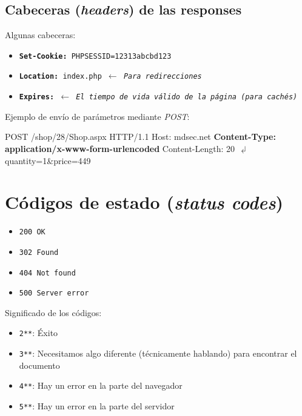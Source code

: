 \documentclass[a4paper,11pt]{memoir}
\begin{document}
\subsection{Cabeceras (\emph{headers}) de las responses}

Algunas cabeceras:

\begin{itemize}
    \item \texttt{\textbf{Set-Cookie:} PHPSESSID=12313abcbd123}
    \item \texttt{\textbf{Location:} index.php \(\leftarrow\) \emph{Para
        redirecciones}}
    \item \texttt{\textbf{Expires:} \(\leftarrow\) \emph{El tiempo de
        vida válido de la página (para cachés)}}
\end{itemize}

Ejemplo de envío de parámetros mediante \emph{POST}:

\begin{codigo}
POST /shop/28/Shop.aspx HTTP/1.1
Host: mdsec.net
\textbf{Content-Type: application/x-www-form-urlencoded}
Content-Length: 20
\(\dlsh\)
quantity=1\&price=449
\end{codigo}

\section{Códigos de estado (\emph{status codes})}

\begin{itemize}
    \item \texttt{200 OK}
    \item \texttt{302 Found}
    \item \texttt{404 Not found}
    \item \texttt{500 Server error}
\end{itemize}

Significado de los códigos:

\begin{itemize}
    \item \texttt{2**}: Éxito
    \item \texttt{3**}: Necesitamos algo diferente (técnicamente hablando)
    para encontrar el documento
    \item \texttt{4**}: Hay un error en la parte del navegador
    \item \texttt{5**}: Hay un error en la parte del servidor
\end{itemize}
\end{document}
